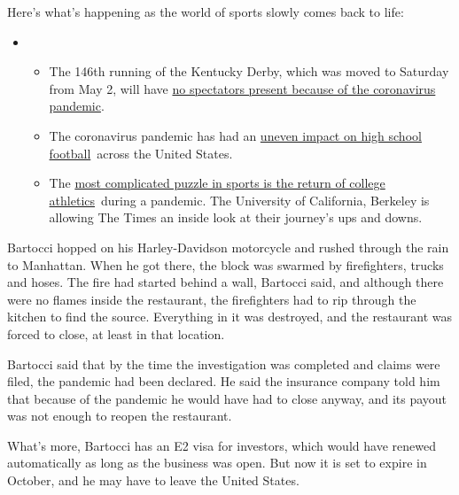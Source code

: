 Here's what's happening as the world of sports slowly comes back to
life:

\begin{itemize}
\item
  \begin{itemize}
  \tightlist
  \item
    The 146th running of the Kentucky Derby, which was moved to Saturday
    from May 2, will have
    \href{https://www.nytimes3xbfgragh.onion/2020/09/04/sports/horse-racing/kentucky-derby-odds-picks.html?action=click\&pgtype=Article\&state=default\&region=MAIN_CONTENT_2\&context=storylines_keepup}{no
    spectators present because of the coronavirus pandemic}.
  \item
    The coronavirus pandemic has had an
    \href{https://www.nytimes3xbfgragh.onion/2020/09/03/sports/ncaafootball/high-school-football-coronavirus-pandemic.html?action=click\&pgtype=Article\&state=default\&region=MAIN_CONTENT_2\&context=storylines_keepup}{uneven
    impact on high school football}~across the United States.
  \item
    The
    \href{https://www.nytimes3xbfgragh.onion/2020/09/02/sports/ncaafootball/coronavirus-cal-athletics-season.html?action=click\&pgtype=Article\&state=default\&region=MAIN_CONTENT_2\&context=storylines_keepup}{most
    complicated puzzle in sports is the return of college
    athletics}~during a pandemic. The University of California, Berkeley
    is allowing The Times an inside look at their journey's ups and
    downs.
  \end{itemize}
\end{itemize}

Bartocci hopped on his Harley-Davidson motorcycle and rushed through the
rain to Manhattan. When he got there, the block was swarmed by
firefighters, trucks and hoses. The fire had started behind a wall,
Bartocci said, and although there were no flames inside the restaurant,
the firefighters had to rip through the kitchen to find the source.
Everything in it was destroyed, and the restaurant was forced to close,
at least in that location.

Bartocci said that by the time the investigation was completed and
claims were filed, the pandemic had been declared. He said the insurance
company told him that because of the pandemic he would have had to close
anyway, and its payout was not enough to reopen the restaurant.

What's more, Bartocci has an E2 visa for investors, which would have
renewed automatically as long as the business was open. But now it is
set to expire in October, and he may have to leave the United States.

